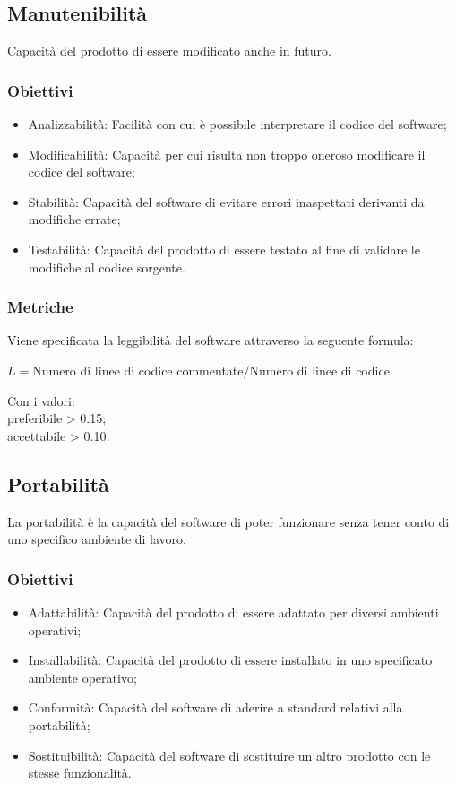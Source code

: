 \subsection{Manutenibilità}
Capacità del prodotto di essere modificato anche in futuro.
\subsubsection{Obiettivi}
\begin{itemize}
	\item Analizzabilità: Facilità con cui è possibile interpretare il codice del software;
	\item Modificabilità: Capacità per cui risulta non troppo oneroso modificare il codice del software;
	\item Stabilità: Capacità del software di evitare errori inaspettati derivanti da modifiche errate;
	\item Testabilità: Capacità del prodotto di essere testato al fine di validare le modifiche al codice sorgente.
\end{itemize}
\subsubsection{Metriche}
Viene specificata la leggibilità del software attraverso la seguente formula:
\begin{center}
	$L = $Numero di linee di codice commentate$ / $Numero di linee di codice
\end{center}
Con i valori:\\
preferibile > 0.15;\\
accettabile > 0.10.

\subsection{Portabilità}
La portabilità è la capacità del software di poter funzionare senza tener conto di uno specifico ambiente di lavoro.
\subsubsection{Obiettivi}
\begin{itemize}
	\item Adattabilità: Capacità del prodotto di essere adattato per diversi ambienti operativi;
	\item Installabilità: Capacità del prodotto di essere installato in uno specificato ambiente operativo;
	\item Conformità: Capacità del software di aderire a standard relativi alla portabilità;
	\item Sostituibilità: Capacità del software di sostituire un altro prodotto con le stesse funzionalità.
\end{itemize}
